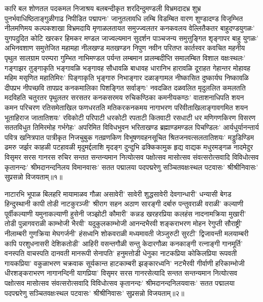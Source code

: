 \begin{flushleft}
कारि बल शोणतल पदकमल निजाश्रय बलबन्दीकृत शरदिन्दुमण्डली विभ्रमदादभ्र शुभ्र पुनर्भवाधिष्ठिताङ्गुळीगाढ निपीडित पद्मापनः' जानुतलावधि लम्बि विडम्बित वारण शुण्डादण्ड विजृम्भित नीलमणिमय कल्पकशाखा विभ्रमदायि मृणाळलतायत समुज्ज्वलतर कनकवलय वेल्लितैकतर बाहुदण्डयुगळः' युगपदुदित कोटि खरकर हिमकर मण्डल जाज्वल्यमान सुदर्शन पाञ्चजन्य समुत्तुङ्गित शृङ्गापर बाहु युगळः' अभिनवशाण समुत्तेजित महामहा नीलखण्ड मतखण्डन निपुण नवीन परितप्त कार्तस्वर कवचित महनीय पृथुल सालग्राम परम्परा गुम्भित नाभिमण्डल पर्यन्त लम्बमान प्रालम्बदीप्ति समालम्बित विशाल वक्षःस्थलः' गङ्गाझर तुङ्गाकृति भङ्गावळि भङ्गावह सौधावळि बाधावह धारानिभ हारावळि दूराहत गेहान्तर मोहावह महिम मसृणित महातिमिरः' पिङ्गाकृति भृङ्गारु निभाङ्गार दळाङ्गामल नीष्कासित दुष्कार्यघ निष्कावळि दीपप्रभ नीपच्छवि तापप्रद कनकमालिका पिशङ्गित सर्वाङ्गः' नवदळित दळवलित मृदुललित कमलतति मदविहति चतुरतर पृथुलतर सरसतर कनकसरमय रुचिकण्ठिका कमनीयकण्ठः' वाताशनाधिपति शयन कमन परिचरण रतिसमेताखिल फणधरतति मतिकरकनकमय नागाभरण परिवीताखिलाङ्गावगमित शयन भूताहिराज जातातिशयः' रविकोटी परिपाटी धरकोटी रपताटी कितवाटी रसधाटी धर मणिगणकिरण विसरण सततविधुत तिमिरमोह गर्भगेहः' अपरिमित विविधभुवन भरिताखण्ड ब्रह्माण्डमण्डल पिचण्डिलः' आर्यधुर्यानन्तार्य पवित्र खनित्रपात पात्रीकृत निजचुबुक गतव्रणकिण विभूषणवहनसूचित श्रितजनवत्सलतातिशयः' मड्डुडिण्डिम ढमरु जर्झर काहळी पटहावळी मृदुमर्द्दलाशि मृदङ्ग दुन्दुभि ढक्किकामुक हृद्य वाद्यक मधुरमङ्गळ नादमेदुर विसृमर सरस गानरस रुचिर सन्तत सन्तन्यमान नित्योत्सव पक्षोत्सव मासोत्सव संवत्सरोत्सवादि विविधोत्सव कृतानन्दः' श्रीमदानन्दनिलय विमानवासः' सतत पद्मालया पदपद्मरेणु सञ्चितवक्षःस्थल पटवासः' श्रीश्रीनिवासः' सुप्रसन्नो विजयताम्॥१॥

नाटारभि भूपाळ बिलहरि मायामाळव गौळा असावेरी' सावेरी
शुद्धसावेरी देवगान्धारी' धन्यासी बेगड हिन्दुस्थानी कापी तोडी नाटकुरञ्जी' श्रीराग सहन अठाण सारङ्गी दर्बारु पन्तुवराळी वराळी' कल्याणी पूर्वीकल्याणी यमुनाकल्याणी हुसेनी जञ्झोटी कौमारी'
कन्नड खरहरप्रिया कलहंस नादनामक्रिया मुखारी' तोडी पुन्नागवराळी
काम्भोजी भैरवी' यदुकुलकाम्भोजी आनन्दभैरवी शङ्कराभरण मोहन
रेगुप्ती सौराष्ट्री' नीलाम्बरी गुणक्रिया मेघगर्जनी' हंसध्वनि शोकवराळी मध्यमावती जेञ्जुरुटी सुरटी' द्विजावन्ती मलयाम्बरी कापि
परशुधनासरी देशिकतोडी' आहिरी वसन्तगौळी सन्तु केदारगौळा कनकाङ्गी रत्नाङ्गी गानमूर्ति' वनस्पति वाचस्पति दानवती मानरूपी सेनापति' हनुमत्तोडी धेनुका नाटकप्रिया कोकिलप्रिया रूपवती गायकप्रिया' वकुळाभरण चक्रवाक सूर्यकान्त हाटकाम्बरी
झङ्कारध्वनि' नटभैरवी गीर्वाणी हरिकाम्भोजी धीरशङ्कराभरण नागानन्दिनी यागप्रिया' विसृमर सरस गानरसेत्यादि सन्तत
सन्तन्यमान नित्योत्सव पक्षोत्सव मासोत्सव संवत्सरोत्सवादि
विविधोत्सव कृतानन्दः' श्रीमदानन्दनिलयवासः' सतत पद्मालया पदपद्मरेणु सञ्चितवक्षःस्थल पटवासः' श्रीश्रीनिवासः' सुप्रसन्नो विजयताम्॥२॥


\end{flushleft}
